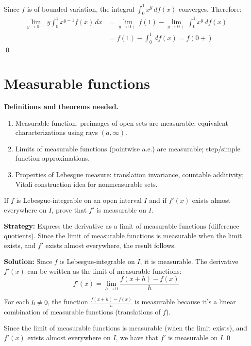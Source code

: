 Since $f$ is of bounded variation, the integral $\int_0^1 x^y \, df(x)$ converges. Therefore:
\begin{align*}
\lim_{y \to 0+} y \int_0^1 x^{y-1}f(x) \, dx &= \lim_{y \to 0+} f(1) - \lim_{y \to 0+} \int_0^1 x^y \, df(x) \\
&= f(1) - \int_0^1 \, df(x) = f(0+)
\end{align*}\qed

\section{Measurable functions}

\noindent\textbf{Definitions and theorems needed.}
\begin{enumerate}[label=(\alph*)]
\item Measurable function: preimages of open sets are measurable; equivalent characterizations using rays $(a,\infty)$.
\item Limits of measurable functions (pointwise a.e.) are measurable; step/simple function approximations.
\item Properties of Lebesgue measure: translation invariance, countable additivity; Vitali construction idea for nonmeasurable sets.
\end{enumerate}



\begin{problembox}
If $f$ is Lebesgue-integrable on an open interval $I$ and if $f'(x)$ exists almost everywhere on $I$, prove that $f'$ is measurable on $I$.
\end{problembox}

\noindent\textbf{Strategy:} Express the derivative as a limit of measurable functions (difference quotients). Since the limit of measurable functions is measurable when the limit exists, and $f'$ exists almost everywhere, the result follows.

\bigskip\noindent\textbf{Solution:}
Since $f$ is Lebesgue-integrable on $I$, it is measurable. The derivative $f'(x)$ can be written as the limit of measurable functions:
\[f'(x) = \lim_{h \to 0} \frac{f(x + h) - f(x)}{h}\]

For each $h \neq 0$, the function $\frac{f(x + h) - f(x)}{h}$ is measurable because it's a linear combination of measurable functions (translations of $f$).

Since the limit of measurable functions is measurable (when the limit exists), and $f'(x)$ exists almost everywhere on $I$, we have that $f'$ is measurable on $I$.\qed


